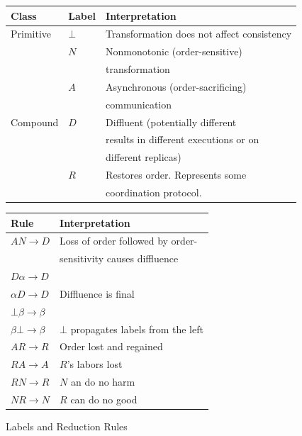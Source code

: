\begin{figure}[t]
\begin{minipage}{.48\textwidth}
\footnotesize

\begin{tabular}{|l|l|l|}
\hline
Class & Label & Interpretation \\ \hline
Primitive & $\bot$ & Transformation does not affect consistency \\ \cline{2-3}
& $N$ & Nonmonotonic (order-sensitive) \\
& & transformation \\ \cline{2-3}
& $A$ & Asynchronous (order-sacrificing) \\
& & communication \\ \hline
Compound & $D$ & Diffluent (potentially different \\
& & results in different executions or on \\
& & different replicas) \\ \cline{2-3}
& $R$ & Restores order.  Represents some \\
& & coordination protocol. \\ \hline

\end{tabular}




\end{minipage}
\begin{minipage}{.48\textwidth}
\raggedleft

\footnotesize
\begin{tabular}{|l|l|}
\hline
Rule & Interpretation \\ \hline
$AN \rightarrow D$ & Loss of order followed by order-\\
&sensitivity causes diffluence \\ \hline
$D \alpha \rightarrow D$ & \\
$\alpha D \rightarrow D$ & Diffluence is final\\ \hline
$\bot \beta \rightarrow \beta$ & \\
$\beta \bot \rightarrow \beta$ & $\bot$ propagates labels from the left \\ \hline
$AR \rightarrow R$ & Order lost and regained \\ \hline
$RA \rightarrow A$ & $R$'s labors lost \\ \hline
$RN \rightarrow R$ & $N$ an do no harm \\ \hline
$NR \rightarrow N$ & $R$ can do no good \\ \hline

\end{tabular}
\end{minipage}
\vspace{-10pt}
\caption{Labels and Reduction Rules}
\label{fig:rules}
\vspace{-2pt}
\end{figure}



